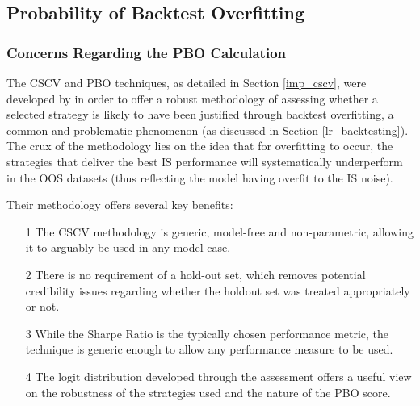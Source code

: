 \documentclass[a4paper,11pt,oneside]{article}
\theoremstyle{plain}
\theoremstyle{definition}
\begin{document}
	\newpage

	\subsection{Probability of Backtest Overfitting}\label{results_pbo}
	
	
	\subsubsection{Concerns Regarding the PBO Calculation}\label{results_pboconcerns}
	
	The CSCV and PBO techniques, as detailed in Section \ref{imp_cscv}, were developed by \citet{BailyPBO} in order to offer a robust methodology of assessing whether a selected strategy is likely to have been justified through backtest overfitting, a common and problematic phenomenon (as discussed in Section \ref{lr_backtesting}). The crux of the methodology lies on the idea that for overfitting to occur, the strategies that deliver the best IS performance will systematically underperform in the OOS datasets (thus reflecting the model having overfit to the IS noise).\newline
	
	Their methodology offers several key benefits:
	\begin{itemize}
		\item[1] The CSCV methodology is generic, model-free and non-parametric, allowing it to arguably be used in any model case.
		\item[2] There is no requirement of a hold-out set, which removes potential credibility issues regarding whether the holdout set was treated appropriately or not.
		\item[3] While the Sharpe Ratio is the typically chosen performance metric, the technique is generic enough to allow any performance measure to be used.
		\item[4] The logit distribution developed through the assessment offers a useful view on the robustness of the strategies used and the nature of the PBO score.
	\end{itemize}
	
\end{document}
